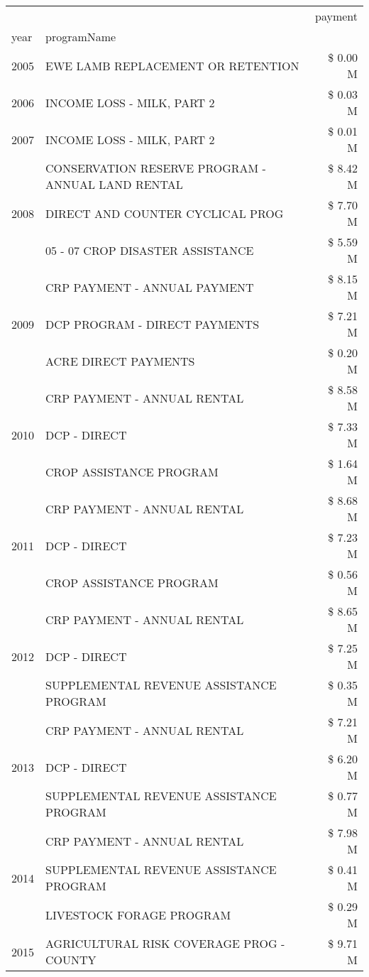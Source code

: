\begin{tabular}{llr}
\toprule
 &  & payment \\
year & programName &  \\
\midrule
2005 & EWE LAMB REPLACEMENT OR RETENTION & \$ 0.00 M \\
\cline{1-3}
2006 & INCOME LOSS - MILK, PART 2 & \$ 0.03 M \\
\cline{1-3}
2007 & INCOME LOSS - MILK, PART 2 & \$ 0.01 M \\
\cline{1-3}
\multirow[t]{3}{*}{2008} & CONSERVATION RESERVE PROGRAM - ANNUAL LAND RENTAL & \$ 8.42 M \\
 & DIRECT AND COUNTER CYCLICAL PROG & \$ 7.70 M \\
 & 05 - 07 CROP DISASTER ASSISTANCE & \$ 5.59 M \\
\cline{1-3}
\multirow[t]{3}{*}{2009} & CRP PAYMENT - ANNUAL PAYMENT & \$ 8.15 M \\
 & DCP PROGRAM - DIRECT PAYMENTS & \$ 7.21 M \\
 & ACRE DIRECT PAYMENTS & \$ 0.20 M \\
\cline{1-3}
\multirow[t]{3}{*}{2010} & CRP PAYMENT - ANNUAL RENTAL & \$ 8.58 M \\
 & DCP - DIRECT & \$ 7.33 M \\
 & CROP ASSISTANCE PROGRAM & \$ 1.64 M \\
\cline{1-3}
\multirow[t]{3}{*}{2011} & CRP PAYMENT - ANNUAL RENTAL & \$ 8.68 M \\
 & DCP - DIRECT & \$ 7.23 M \\
 & CROP ASSISTANCE PROGRAM & \$ 0.56 M \\
\cline{1-3}
\multirow[t]{3}{*}{2012} & CRP PAYMENT - ANNUAL RENTAL & \$ 8.65 M \\
 & DCP - DIRECT & \$ 7.25 M \\
 & SUPPLEMENTAL REVENUE ASSISTANCE PROGRAM & \$ 0.35 M \\
\cline{1-3}
\multirow[t]{3}{*}{2013} & CRP PAYMENT - ANNUAL RENTAL & \$ 7.21 M \\
 & DCP - DIRECT & \$ 6.20 M \\
 & SUPPLEMENTAL REVENUE ASSISTANCE PROGRAM & \$ 0.77 M \\
\cline{1-3}
\multirow[t]{3}{*}{2014} & CRP PAYMENT - ANNUAL RENTAL & \$ 7.98 M \\
 & SUPPLEMENTAL REVENUE ASSISTANCE PROGRAM & \$ 0.41 M \\
 & LIVESTOCK FORAGE PROGRAM & \$ 0.29 M \\
\cline{1-3}
\multirow[t]{3}{*}{2015} & AGRICULTURAL RISK COVERAGE PROG - COUNTY & \$ 9.71 M \\

\end{tabular}
